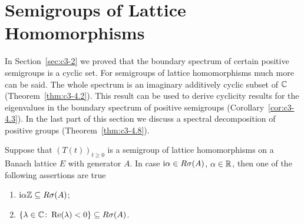\section{Semigroups of Lattice Homomorphisms}\label{sec:c3-4}
In Section~\ref{sec:c3-2} we proved that the boundary spectrum of certain positive semigroups is a cyclic set. 
For semigroups of lattice homomorphisms much more can be said. 
The whole spectrum is an imaginary additively cyclic subset of\/ $\mathbb{C} $ (\cf Theorem~\ref{thm:c3-4.2}). 
This result can be used to derive cyclicity results for the eigenvalues in the boundary spectrum of positive semigroups (\cf Corollary~\ref{cor:c3-4.3}). 
In the last part of this section we discuss a spectral decomposition of positive groups (\cf Theorem~\ref{thm:c3-4.8}).
\begin{lemma}\label{lem:c3-4.1}
	Suppose that $(T(t))_{t  \geq 0}$ is a semigroup of lattice homomorphisms on a Banach lattice $E$ with generator $A$.
	In case $\mathrm{i}\alpha \in R\sigma(A)$, $\alpha \in \mathbb{R} $, then one of the following assertions are true
	\begin{enumerate}[\upshape (a)]
		\item $\mathrm{i}\alpha\mathbb{Z} \subseteq R\sigma(A)$;
		\item $\{\lambda \in \mathbb{C}  \colon \mathop{}\!\mathrm{Re}(\lambda) < 0 \} \subseteq R\sigma(A)$.
	\end{enumerate}
\end{lemma}
